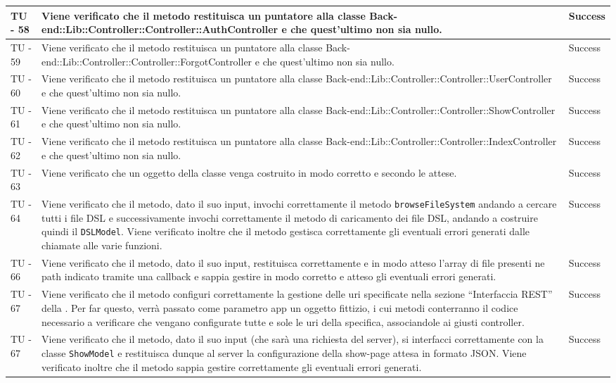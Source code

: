 \begin{center}
\begin{longtable}{ | p{3cm} | p{9cm} | p{2cm} | }
TU - 58 & Viene verificato che il metodo restituisca un puntatore alla classe Back-end::Lib::Controller::Controller::AuthController e che quest'ultimo non sia nullo. & Success \\ \hline
TU - 59 & Viene verificato che il metodo restituisca un puntatore alla classe Back-end::Lib::Controller::Controller::ForgotController e che quest'ultimo non sia nullo. & Success \\ \hline
TU - 60 & Viene verificato che il metodo restituisca un puntatore alla classe Back-end::Lib::Controller::Controller::UserController e che quest'ultimo non sia nullo. & Success \\ \hline
TU - 61 & Viene verificato che il metodo restituisca un puntatore alla classe Back-end::Lib::Controller::Controller::ShowController e che quest'ultimo non sia nullo. & Success \\ \hline
TU - 62 & Viene verificato che il metodo restituisca un puntatore alla classe Back-end::Lib::Controller::Controller::IndexController e che quest'ultimo non sia nullo. & Success \\ \hline
TU - 63 & Viene verificato che un oggetto della classe venga costruito in modo corretto e secondo le attese. & Success \\ \hline
TU - 64 & Viene verificato che il metodo, dato il suo input, invochi correttamente il metodo \texttt{browseFileSystem} andando a cercare tutti i file DSL e successivamente invochi correttamente il metodo di caricamento dei file DSL, andando a costruire quindi il \texttt{DSLModel}. Viene verificato inoltre che il metodo gestisca correttamente gli eventuali errori generati dalle chiamate alle varie funzioni. & Success \\ \hline
TU - 66 & Viene verificato che il metodo, dato il suo input, restituisca  correttamente e in modo atteso l'array di file presenti ne path indicato tramite una callback e sappia gestire in modo corretto e atteso gli eventuali errori generati. & Success \\ \hline
TU - 67 & Viene verificato che il metodo configuri correttamente la gestione delle uri specificate nella sezione ``Interfaccia REST'' della \SpecificaTecnica{}. Per far questo, verrà passato come parametro app un oggetto fittizio, i cui metodi conterranno il codice necessario a verificare che vengano configurate tutte e sole le uri della specifica, associandole ai giusti controller. & Success \\ \hline
TU - 67 & Viene verificato che il metodo, dato il suo input (che sarà una richiesta del server), si interfacci correttamente con la classe \texttt{ShowModel} e restituisca dunque al server la configurazione della show-page attesa in formato JSON. Viene verificato inoltre che il metodo sappia gestire correttamente gli eventuali errori generati.  & Success \\ \hline

\end{longtable}
\end{center}
